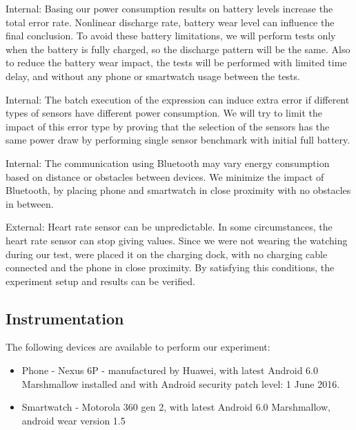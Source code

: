 Internal: Basing our power consumption  results on battery levels increase the total error rate. Nonlinear discharge rate,
battery wear level\cite{battery_wear_proc} can influence the final conclusion. To avoid these battery limitations, we will perform tests only when the battery is fully charged, 
so the discharge pattern will be the same. Also to reduce the battery wear impact, the tests will be performed with limited time delay,
and without any phone or smartwatch usage between the tests.

 Internal: The batch execution of the expression can induce extra error if different types of sensors have different power consumption. 
 We will try to limit the impact of this error type by proving that the selection of the sensors has the same power draw by
 performing single sensor benchmark with initial full battery. 
 
 Internal: The communication using Bluetooth may vary energy consumption based on distance or obstacles between devices.
 We minimize the impact of Bluetooth, by placing phone and smartwatch in close proximity with no obstacles in between.
 
 External: Heart rate sensor can be unpredictable. In some circumstances, the heart rate sensor can stop giving values. 
 Since we were not wearing the watching during our test, were placed it on the charging dock, with no charging cable connected and the phone
 in close proximity. By satisfying this conditions, the experiment setup and results can be verified.
 
 \subsection{Instrumentation}
 The following devices are available to perform our experiment:
 \begin{itemize}
  \item Phone - Nexus 6P - manufactured by Huawei,  with latest Android 6.0 Marshmallow installed and with Android security patch level: 1 June 2016. 
  \item Smartwatch - Motorola 360 gen 2, with latest Android 6.0 Marshmallow, android wear version 1.5 
 \end{itemize}

